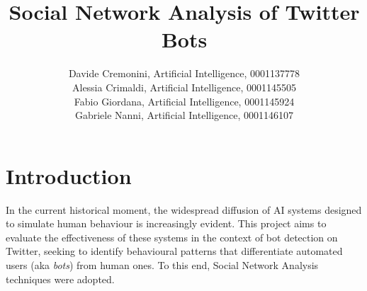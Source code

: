 \documentclass[12pt, a4paper]{article}
\author{Davide Cremonini, Artificial Intelligence, 0001137778
\\Alessia Crimaldi, Artificial Intelligence, 0001145505
\\Fabio Giordana, Artificial Intelligence, 0001145924
\\Gabriele Nanni, Artificial Intelligence, 0001146107}
\date{}
\title{Social Network Analysis of Twitter Bots}
\begin{document}
\maketitle










\section{Introduction} \label{introduction}
	In the current historical moment, the widespread diffusion of AI systems designed to simulate human behaviour is increasingly evident. This project aims to evaluate the effectiveness of these systems in the context of bot detection on Twitter, seeking to identify behavioural patterns that differentiate automated users (aka \textit{bots}) from human ones. To this end, Social Network Analysis techniques were adopted.
\end{document}
